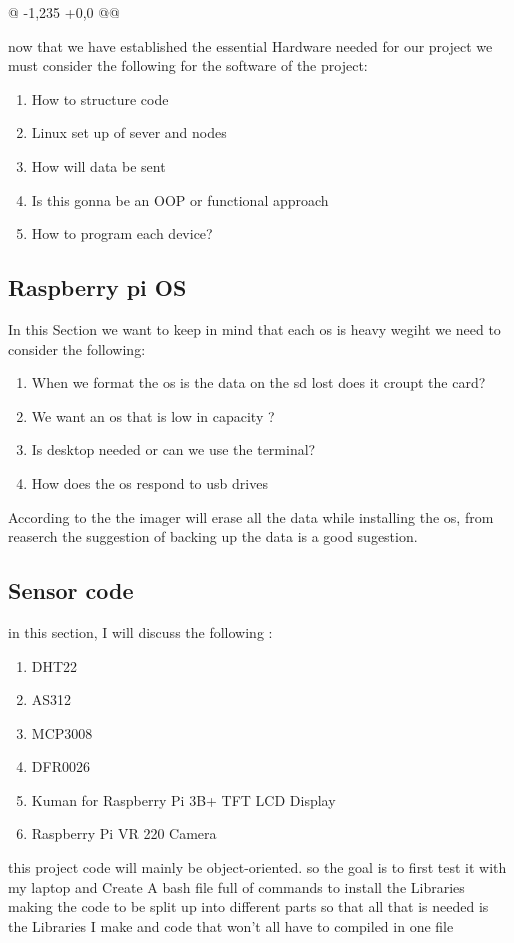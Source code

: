 @ -1,235 +0,0 @@

	now that we have established the  essential Hardware needed for our project we must consider the following  for the software of the  project:
	\begin{enumerate}
	    \item How to structure code 
	    \item Linux set up of sever and nodes
	    \item How will data be sent
	    \item Is this gonna be an OOP or functional  approach
	    \item How to program each device?
	\end{enumerate}
	\subsection{Raspberry pi OS}
	\label{pi os}
	In this Section  we want to keep in mind  that each os is  heavy wegiht  we need to consider the following:
	\begin{enumerate}
		\item When we  format the os is the  data on the sd lost does it croupt the  card?
		\item We want an os that is low in capacity ?
		\item Is desktop needed or can we  use  the  terminal?
		\item How does  the os  respond to usb drives
	\end{enumerate}
	 According to the \cite{projects} the imager will erase all the data while installing the os, from reaserch  the suggestion of backing up the data is  a  good sugestion.
	\subsection{Sensor code}
	in this section, I will discuss the following :
	\begin{enumerate}
		\item DHT22
		\item AS312
		\item MCP3008
		\item DFR0026
		\item Kuman for Raspberry Pi 3B+ TFT LCD Display
		\item Raspberry Pi VR 220 Camera 
	\end{enumerate}
	this project code will mainly be object-oriented. so the goal is to first test it with my laptop and  Create A bash file  full of  commands to install  the Libraries
	making the code to be split up  into  different parts so that all that is needed is the Libraries I make and code that won't all have to  compiled in one file

